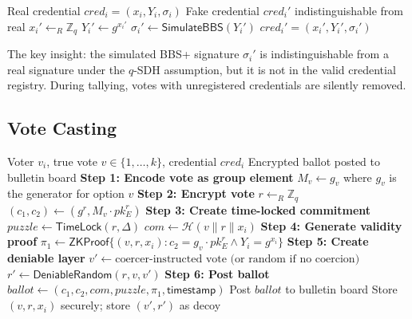 \documentclass[11pt,a4paper]{article}
\newcommand{\ZZ}{\mathbb{Z}}
\newcommand{\HH}{\mathcal{H}}
\begin{document}
\begin{algorithm}[H]
\caption{Fake Credential Generation}
\label{alg:fake-cred}
\begin{algorithmic}[1]
\Require Real credential $\mathit{cred}_i = (x_i, Y_i, \sigma_i)$
\Ensure Fake credential $\mathit{cred}_i'$ indistinguishable from real
\State $x_i' \leftarrow_R \ZZ_q$ 
\State $Y_i' \leftarrow g^{x_i'}$ 
\State $\sigma_i' \leftarrow \mathsf{SimulateBBS}(Y_i')$ 
\State \Return $\mathit{cred}_i' = (x_i', Y_i', \sigma_i')$
\end{algorithmic}
\end{algorithm}

The key insight: the simulated BBS+ signature $\sigma_i'$ is indistinguishable from a real signature under the $q$-SDH assumption, but it is not in the valid credential registry. During tallying, votes with unregistered credentials are silently removed.

\subsection{Vote Casting}

\begin{algorithm}[H]
\caption{Shadow Vote Casting}
\label{alg:cast}
\begin{algorithmic}[1]
\Require Voter $v_i$, true vote $v \in \{1, \ldots, k\}$, credential $\mathit{cred}_i$
\Ensure Encrypted ballot posted to bulletin board
\Statex \textbf{Step 1: Encode vote as group element}
\State $M_v \leftarrow g_v$ where $g_v$ is the generator for option $v$
\Statex \textbf{Step 2: Encrypt vote}
\State $r \leftarrow_R \ZZ_q$
\State $(c_1, c_2) \leftarrow (g^r, M_v \cdot pk_E^r)$ 
\Statex \textbf{Step 3: Create time-locked commitment}
\State $\mathit{puzzle} \leftarrow \mathsf{TimeLock}(r, \Delta)$ 
\State $\mathit{com} \leftarrow \HH(v \| r \| x_i)$ 
\Statex \textbf{Step 4: Generate validity proof}
\State $\pi_1 \leftarrow \mathsf{ZKProof}\{(v, r, x_i) : c_2 = g_v \cdot pk_E^r \wedge Y_i = g^{x_i}\}$
\Statex \textbf{Step 5: Create deniable layer}
\State $v' \leftarrow \text{coercer-instructed vote (or random if no coercion)}$
\State $r' \leftarrow \mathsf{DeniableRandom}(r, v, v')$ 
\Statex \textbf{Step 6: Post ballot}
\State $\mathit{ballot} \leftarrow (c_1, c_2, \mathit{com}, \mathit{puzzle}, \pi_1, \mathsf{timestamp})$
\State Post $\mathit{ballot}$ to bulletin board
\State Store $(v, r, x_i)$ securely; store $(v', r')$ as decoy
\end{algorithmic}
\end{algorithm}
\end{document}
